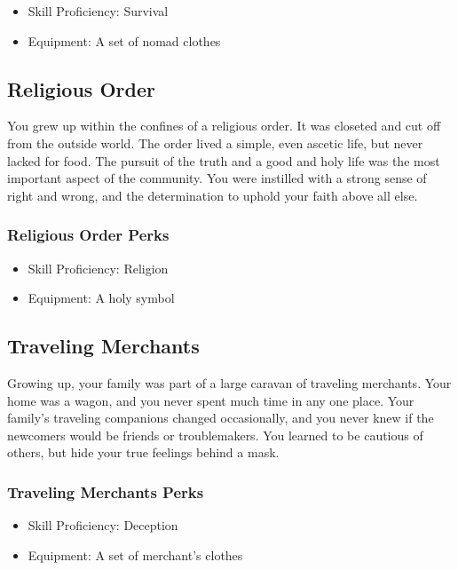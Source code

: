 \begin{multicols}{2}
\begin{itemize}
  \item Skill Proficiency: Survival
  \item Equipment: A set of nomad clothes
\end{itemize}

\subsection{Religious Order}

You grew up within the confines of a religious order. It was closeted
and cut off from the outside world. The order lived a simple, even
ascetic life, but never lacked for food. The pursuit of the truth and
a good and holy life was the most important aspect of the community.
You were instilled with a strong sense of right and wrong, and the
determination to uphold your faith above all else.

\subsubsection{Religious Order Perks}

\begin{itemize}
  \item Skill Proficiency: Religion
  \item Equipment: A holy symbol
\end{itemize}

\subsection{Traveling Merchants}

Growing up, your family was part of a large caravan of traveling merchants.
Your home was a wagon, and you never spent much time in any one place.
Your family's traveling companions changed occasionally, and you never
knew if the newcomers would be friends or troublemakers. You learned to
be cautious of others, but hide your true feelings behind a mask.

\subsubsection{Traveling Merchants Perks}

\begin{itemize}
  \item Skill Proficiency: Deception
  \item Equipment: A set of merchant's clothes
\end{itemize}


\end{multicols}
